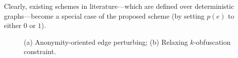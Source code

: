 Clearly, existing schemes in literature---which are defined over deterministic graphs---become a special case of the proposed scheme (by setting $p(e)$ to either $0$ or $1$). 
\begin{figure}
    \vspace{-0.7em}
    \caption{(a) Anonymity-oriented edge perturbing; (b) Relaxing $k$-obfuscation constraint.}
    \vspace{-1.5em}
\end{figure}






